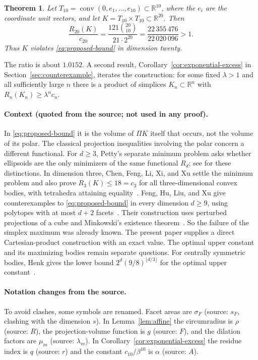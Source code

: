\documentclass[11pt]{article}
\newtheorem{theorem}{Theorem}
\newcommand{\R}{\mathbb R}
\DeclareMathOperator{\conv}{conv}
\begin{document}
\begin{theorem}\label{thm:counterexample}
Let \(T_{10}=\conv(0,e_1,\ldots,e_{10})\subset\R^{10}\), where the
\(e_i\) are the coordinate unit vectors, and let
\(K=T_{10}\times T_{10}\subset\R^{20}\). Then
\[
 \frac{R_{20}(K)}{c_{20}}
 =\frac{121\binom{20}{10}}{21\cdot2^{20}}
 =\frac{22\,355\,476}{22\,020\,096}>1.
\]
Thus \(K\) violates \eqref{eq:proposed-bound} in dimension twenty.
\end{theorem}

The ratio is about \(1.0152\). A second result,
Corollary~\ref{cor:exponential-excess} in
Section~\ref{sec:counterexample}, iterates the construction: for some fixed
\(\lambda>1\) and all sufficiently large \(n\) there is a product of
simplices \(K_n\subset\R^n\) with \(R_n(K_n)\ge\lambda^nc_n\).

\paragraph{Context (quoted from the source; not used in any proof).}
In \eqref{eq:proposed-bound} it is the volume of \(\Pi K\) itself that
occurs, not the volume of its polar. The classical projection inequalities
involving the polar concern a different functional. For \(d\ge3\), Petty's
separate minimum problem asks whether ellipsoids are the only minimizers of
the same functional \(R_d\); see \cite[Section~1]{Saroglou} for these
distinctions. In dimension three, Chen, Feng, Li, Xi, and Xu settle the
minimum problem and also prove \(R_3(K)\le18=c_3\) for all
three-dimensional convex bodies, with tetrahedra attaining
equality~\cite[Theorems~1.1 and~1.2]{ChenEtAl}. Feng, Hu, Liu, and Xu give
counterexamples to \eqref{eq:proposed-bound} in every dimension \(d\ge9\),
using polytopes with at most \(d+2\) facets~\cite[Theorem~1.3]{FengEtAl}.
Their construction uses perturbed projections of a cube and Minkowski's
existence theorem~\cite[Section~4]{FengEtAl}. So the failure of the simplex
maximum was already known. The present paper supplies a direct
Cartesian-product construction with an exact value. The optimal upper
constant and its maximizing bodies remain separate questions. For centrally
symmetric bodies, Henk gives the lower bound
\(2^d(9/8)^{\lfloor d/3\rfloor}\) for the optimal upper
constant~\cite{Henk}.

\paragraph{Notation changes from the source.}
To avoid clashes, some symbols are renamed. Facet areas are \(\sigma_F\)
(source: \(s_F\), clashing with the dimension \(s\)). In
Lemma~\ref{lem:affine} the circumradius is \(\rho\) (source: \(R\)), the
projection-volume function is \(g\) (source: \(F\)), and the dilation
factors are \(\mu_m\) (source: \(\lambda_m\)). In
Corollary~\ref{cor:exponential-excess} the residue index is \(q\) (source:
\(r\)) and the constant \(c_{10}/\beta^{10}\) is \(\alpha\) (source: \(A\)).
\end{document}
